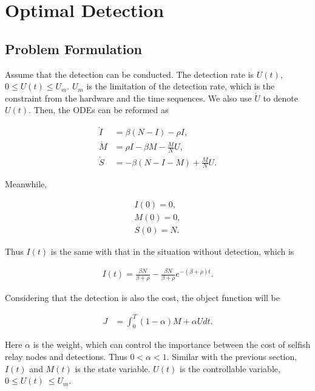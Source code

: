 \section{Optimal Detection}
\label{opt_detect}
\subsection{Problem Formulation}
Assume that the detection can be conducted.
The detection rate is $U(t)$, $0 \le U(t) \le U_{m}$.
$U_{m}$ is the limitation of the detection rate, which is the constraint from the hardware and the time sequences.
We also use $\dot{U}$ to denote $U(t)$.
Then, the ODEs can be reformed as
\begin{small}
\begin{equation}
\label{eq:SIM_t}
\begin{aligned}
\dot{I} &= \beta (N-I) - \rho I, \\
\dot{M} &= \rho I  - \beta M - \frac{M}{N} U,\\
\dot{S} &= - \beta (N-I-M) + \frac{M}{N} U.
\end{aligned}
\end{equation}
\end{small}
Meanwhile, 
\begin{small}
\begin{equation}
\label{eq:SIM_0}
\begin{aligned}
I(0)=0,\\
M(0)=0,\\
S(0)=N.
\end{aligned}
\end{equation}
\end{small}

Thus $I(t)$ is the same with that in the situation without detection, which is
\begin{small}
\begin{equation}
\label{eq:I}
\begin{aligned}
I(t) = \frac{ \beta N }{ \beta + \rho } - \frac{ \beta N }{ \beta + \rho } e^{-(\beta + \rho)t}.
\end{aligned}
\end{equation}
\end{small}

Considering that the detection is also the cost,
the object function will be
\begin{small}
\begin{equation}
\nonumber
\begin{aligned}
J &= \int_{0}^{T} (1-\alpha) M + \alpha U dt.
\end{aligned}
\end{equation}
\end{small}
Here $\alpha$ is the weight, which can control the importance 
between the cost of selfish relay nodes
and detections.
Thus $0 < \alpha < 1$.
Similar with the previous section,
$I(t)$ and $M(t)$ is the state variable.
$U(t)$ is the controllable variable, $0 \le U(t)\ \le U_{m}$.

